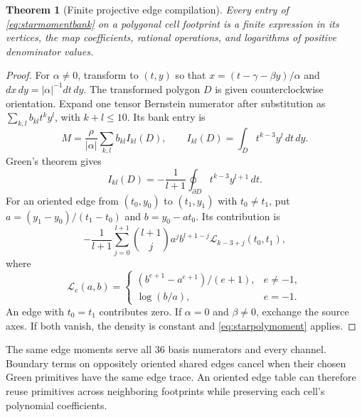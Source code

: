 \documentclass[journal]{IEEEtran}
\newtheorem{theorem}{Theorem}
\begin{document}
\begin{theorem}[Finite projective edge compilation]
Every entry of \eqref{eq:starmomentbank} on a polygonal cell footprint is a
finite expression in its vertices, the map coefficients, rational operations,
and logarithms of positive denominator values.
\end{theorem}
\begin{proof}
For $\alpha\ne0$, transform to $(t,y)$ so that
$x=(t-\gamma-\beta y)/\alpha$ and $dx\,dy=|\alpha|^{-1}dt\,dy$.
The transformed polygon $D$ is given counterclockwise orientation. Expand
one tensor Bernstein numerator after substitution as
$\sum_{k,l}b_{kl}t^ky^l$, with $k+l\leq10$. Its bank entry is
\begin{equation}
 M=\frac{\rho}{|\alpha|}\sum_{k,l}b_{kl}I_{kl}(D),\qquad
 I_{kl}(D)=\int_D t^{k-3}y^l\,dt\,dy.
\end{equation}
Green's theorem gives
\begin{equation}
 I_{kl}(D)=-\frac1{l+1}\oint_{\partial D}t^{k-3}y^{l+1}\,dt.
 \label{eq:starprojectiveedge}
\end{equation}
For an oriented edge from $(t_0,y_0)$ to $(t_1,y_1)$ with $t_0\ne t_1$,
put $a=(y_1-y_0)/(t_1-t_0)$ and $b=y_0-at_0$. Its contribution is
\begin{equation}
 -\frac1{l+1}\sum_{j=0}^{l+1}\binom{l+1}{j}
 a^jb^{l+1-j}\mathcal L_{k-3+j}(t_0,t_1),
 \label{eq:staredgeprimitive}
\end{equation}
where
\begin{equation}
 \mathcal L_e(a,b)=
 \begin{cases}
 (b^{e+1}-a^{e+1})/(e+1),&e\ne-1,\\
 \log(b/a),&e=-1.
 \end{cases}
\end{equation}
An edge with $t_0=t_1$ contributes zero. If $\alpha=0$ and $\beta\ne0$,
exchange the source axes. If both vanish, the density is constant and
\eqref{eq:starpolymoment} applies.
\end{proof}

The same edge moments serve all 36 basis numerators and every channel.
Boundary terms on oppositely oriented shared edges cancel when their chosen
Green primitives have the same edge trace.
An oriented edge table can therefore reuse primitives across neighboring
footprints while preserving each cell's polynomial coefficients.
\end{document}
